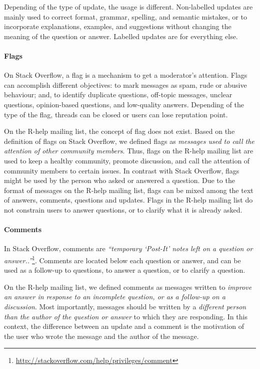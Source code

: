 	Depending of the type of update, the usage is different.
	Non-labelled updates are mainly used to correct format, grammar, spelling, and semantic mistakes, or to incorporate explanations, examples, and suggestions without changing the meaning of the question or answer. Labelled updates are for everything else.


\paragraph*{Flags}

	On Stack Overflow, a flag is a mechanism to get a moderator's attention.
	Flags can accomplish different objectives: to mark messages as spam, rude or abusive behaviour; and, to identify duplicate questions, off-topic messages, unclear questions, opinion-based questions, and low-quality answers.
	Depending of the type of the flag, threads can be closed or users can lose reputation point.
    
    On the R-help mailing list, the concept of flag does not exist. 
    Based on the definition of flags on Stack Overflow, we defined flags as \emph{messages used to call the attention of other community members}.
    Thus, flags on the R-help mailing list are used to keep a healthy community, promote discussion, and call the attention of community members to certain issues.
    In contrast with Stack Overflow, flags might be used by the person who asked or answered a question.
    Due to the format of messages on the R-help mailing list, flags can be mixed among the text of answers, comments, questions and updates.
	Flags in the R-help mailing list do not constrain users to answer questions, or to clarify what it is already asked.

\paragraph*{Comments}
In Stack Overflow, comments are \textit{``temporary `Post-It' notes left on a question or answer..''}\footnote{\url{http://stackoverflow.com/help/privileges/comment}}.
	Comments are located below each question or answer, and can be used as a follow-up to questions, to answer a question, or to clarify a question.

	On the R-help mailing list, we defined comments as messages written to \emph{improve an answer in response to an incomplete question, or as a follow-up on a discussion}.
	Most importantly, messages should be written by a \emph{different person than the author of the question or answer} to which they are responding.
	In this context, the difference between an update and a comment is the motivation of the user who wrote the message and the author of the message.

